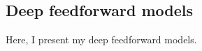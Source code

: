 \subsection{Deep feedforward models}
\label{sub:deep_feedforward_models}

Here, I present my deep feedforward models.